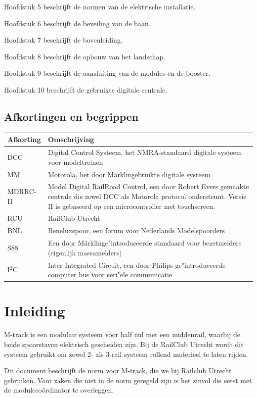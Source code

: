 \documentclass[12pt,a4paper]{report}
\newcommand*{\marklin}{M\"{a}rklin}
\newcommand*{\isqc}{I$^{2}$C}
\begin{document}
Hoofdstuk 5 beschrijft de normen van de elektrische installatie.

Hoofdstuk 6 beschrijft de beveiling van de baan.

Hoofdstuk 7 beschrijft de bovenleiding.

Hoofdstuk 8 beschrijft de opbouw van het landschap.

Hoofdstuk 9 beschrijft de aansluiting van de modules en de booster.

Hoofdstuk 10 beschrijft de gebruikte digitale centrale.

\section{Afkortingen en begrippen}
\begin{tabular}{| l |p{13cm}|}
\hline
\rowcolor[gray]{0.84}Afkorting & Omschrijving\\
\hline
DCC & Digital Control Systeem, het NMRA-standaard digitale systeem voor modeltreinen\\
\hline
MM & Motorola, het door \marklin gebruikte digitale systeem\\
\hline
MDRRC-II&Model Digital RailRoad Control, een door Robert Evers gemaakte centrale die zowel DCC als Motorola protocol ondersteunt. Versie II is gebaseerd op een microcontroller met touchscreen.\\
\hline
RCU&RailClub Utrecht\\
\hline
BNL&Beneluxspoor, een forum voor Nederlands Modelspoorders\\
\hline
S88&Een door \marklin ge"{i}ntroduceerde standaard voor bezetmelders (eigenlijk massamelders)\\
\hline
\isqc &Inter-Integrated Circuit, een door Philips ge"{i}ntroduceerde computer bus voor seri"{e}le communicatie\\
\hline
\end{tabular}

\chapter{Inleiding}

M-track is een modulair systeem voor half nul met een middenrail, waarbij de beide spoorstaven elektrisch gescheiden zijn. Bij de RailClub Utrecht wordt dit systeem gebruikt om zowel 2- als 3-rail systeem rollend materieel te laten rijden.

Dit document beschrijft de norm voor M-track, die we bij Railclub Utrecht gebruiken. Voor zaken die niet in de norm geregeld zijn is het zinvol die eerst met de moduleco\"{o}rdinator te overleggen.
\end{document}
